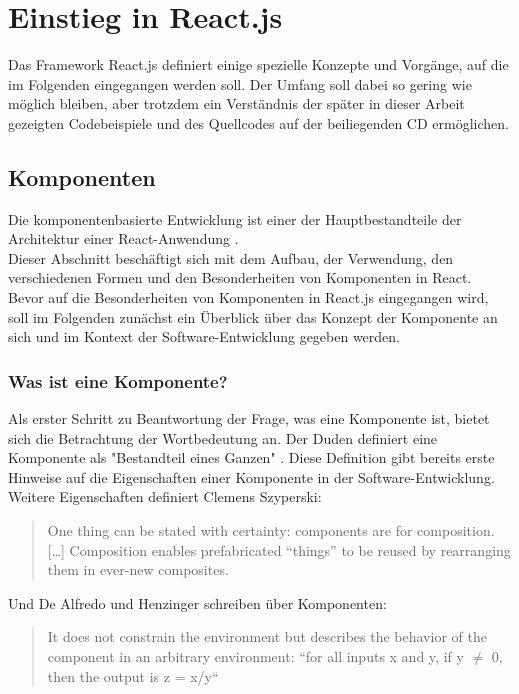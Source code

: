 \section{Einstieg in React.js}
Das Framework React.js definiert einige spezielle Konzepte und Vorgänge, auf die im Folgenden eingegangen werden soll. Der Umfang soll dabei so gering wie möglich bleiben, aber trotzdem ein Verständnis der später in dieser Arbeit gezeigten Codebeispiele und des Quellcodes auf der beiliegenden CD ermöglichen.

\subsection{Komponenten}
Die komponentenbasierte Entwicklung ist einer der Hauptbestandteile der Architektur einer React-Anwendung \cite[S. 28]{Gackenheimer201509}. \\
Dieser Abschnitt beschäftigt sich mit dem Aufbau, der Verwendung, den verschiedenen Formen und den Besonderheiten von Komponenten in React.\\
Bevor auf die Besonderheiten von Komponenten in React.js eingegangen wird, soll im Folgenden zunächst ein Überblick über das Konzept der Komponente an sich und im Kontext der Software-Entwicklung gegeben werden.

\subsubsection{Was ist eine Komponente?}
\label{chap:component}
Als erster Schritt zu Beantwortung der Frage, was eine Komponente ist, bietet sich die Betrachtung der Wortbedeutung an. Der Duden definiert eine Komponente als "Bestandteil eines Ganzen" \cite{Dudenredaktion2006}. Diese Definition gibt bereits erste Hinweise auf die Eigenschaften einer Komponente in der Software-Entwicklung.\\
Weitere Eigenschaften definiert Clemens Szyperski:

\begin{quote}
  One thing can be stated with certainty: components are for composition. […] Composition enables prefabricated “things” to be reused by rearranging them in ever-new composites. \cite{Szyperski200211}
\end{quote}

Und De Alfredo und Henzinger schreiben über Komponenten:

\begin{quote}
  It does not constrain the environment but describes the behavior of the component in an arbitrary environment: “for all inputs x and y, if y $\neq$ 0, then the output is z = x/y“ \cite{de2001interface}
\end{quote}

